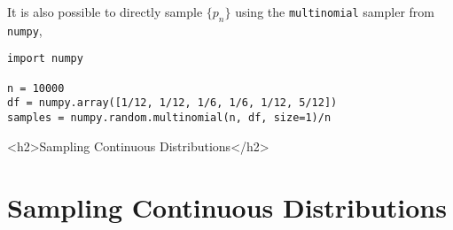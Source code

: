 \documentclass[12pt]{article}
\begin{document}
\iftex
It is also possible to directly sample $\{p_n\}$ using the \texttt{multinomial} sampler from
\texttt{numpy},

\begin{verbatim}
import numpy

n = 10000
df = numpy.array([1/12, 1/12, 1/6, 1/6, 1/12, 5/12])
samples = numpy.random.multinomial(n, df, size=1)/n
\end{verbatim}
\fi

\ifblog
<h2>Sampling Continuous Distributions</h2>
\fi
\iftex
\section{Sampling Continuous Distributions}
\fi
\end{document}
